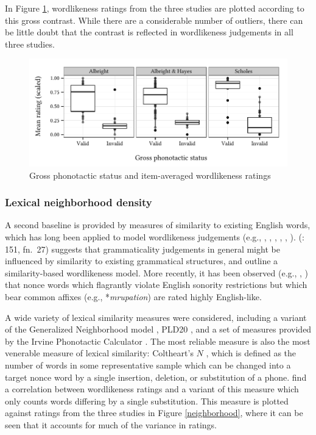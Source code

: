 In Figure \ref{boxplot}, wordlikeness ratings from the three studies are plotted according to this gross contrast. While there are a considerable number of outliers, there can be little doubt that the contrast is reflected in wordlikeness judgements in all three studies.

\begin{figure}
\centering
\includegraphics{boxplot.pdf}
\caption{Gross phonotactic status and item-averaged wordlikeness ratings}
\label{boxplot}
\end{figure}

\subsubsection{Lexical neighborhood density}

A second baseline is provided by measures of similarity to existing English words, which has long been applied to model wordlikeness judgements (e.g., \citealt{Bailey2001}, \citealt{Greenberg1964}, \citealt{Kirby2007}, \citealt{Ohala1986b}, \citealt{Shademan2006,Shademan2007}, \citealt{Vitevitch1998,Vitevitch1999a}). \citeauthor{LSLT} (\citeyear{LSLT}: 151, fn.~27) suggests that grammaticality judgements in general might be influenced by similarity to existing grammatical structures, and \citet[417f.]{SPE} outline a similarity-based wordlikeness model. More recently, it has been observed (e.g., \citealt[51]{Coleman1997}, \citealt{Hay2004a}) that nonce words which flagrantly violate English sonority restrictions but which bear common affixes (e.g., *\emph{mrupation}) are rated highly English-like.

A wide variety of lexical similarity measures were considered, including a variant of the Generalized Neighborhood model \citep{Bailey2001}, PLD20 \citep{Suarez2011}, and a set of measures provided by the Irvine Phonotactic Calculator \citep{Vaden2009}. The most reliable measure is also the most venerable measure of lexical similarity: Coltheart's $N$ \citep{Coltheart1977}, which is defined as the number of words in some representative sample which can be changed into a target nonce word by a single insertion, deletion, or substitution of a phone. \citet{Greenberg1964} find a correlation between wordlikeness ratings and a variant of this measure which only counts words differing by a single substitution. This measure is plotted against ratings from the three studies in Figure \ref{neighborhood}, where it can be seen that it accounts for much of the variance in ratings.

